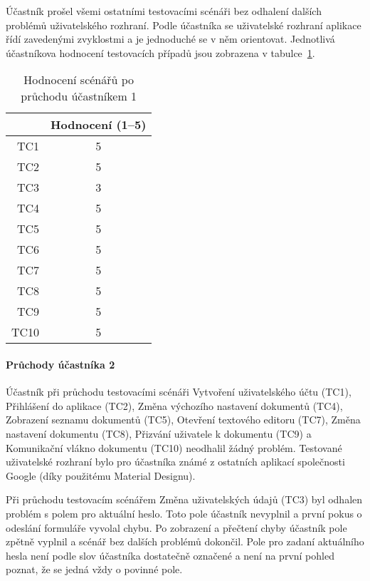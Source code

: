 Účastník prošel všemi ostatními testovacími scénáři bez odhalení dalších problémů uživatelského rozhraní.
Podle účastníka se uživatelské rozhraní aplikace řídí zavedenými zvyklostmi a je jednoduché se v něm orientovat.
Jednotlivá účastníkova hodnocení testovacích případů jsou zobrazena v tabulce~\ref{tab:poPrůchoduÚčastníkem1}.

\begin{table}[ht!]
    \centering
    \caption{Hodnocení scénářů po průchodu účastníkem 1}
    \label{tab:poPrůchoduÚčastníkem1}
    \begin{tabular}{r|c}
        & Hodnocení (1--5) \\ \hline
        TC1 & 5 \\
        TC2 & 5 \\
        TC3 & 3 \\
        TC4 & 5 \\
        TC5 & 5 \\
        TC6 & 5 \\
        TC7 & 5 \\
        TC8 & 5 \\
        TC9 & 5 \\
        TC10 & 5 \\
    \end{tabular}
\end{table}

\paragraph{Průchody účastníka 2}

Účastník při průchodu testovacími scénáři Vytvoření uživatelského účtu (TC1), Přihlášení do aplikace (TC2), Změna výchozího nastavení dokumentů (TC4), Zobrazení seznamu dokumentů (TC5),  Otevření textového editoru (TC7), Změna nastavení dokumentu (TC8), Přizvání uživatele k dokumentu (TC9) a Komunikační vlákno dokumentu (TC10) neodhalil žádný problém.
Testované uživatelské rozhraní bylo pro účastníka známé z ostatních aplikací společnosti Google (díky použitému Material Designu).

Při průchodu testovacím scénářem Změna uživatelských údajů (TC3) byl odhalen problém s polem pro aktuální heslo.
Toto pole účastník nevyplnil a první pokus o odeslání formuláře vyvolal chybu.
Po zobrazení a přečtení chyby účastník pole zpětně vyplnil a scénář bez dalších problémů dokončil.
Pole pro zadaní aktuálního hesla není podle slov účastníka dostatečně označené a není na první pohled poznat, že se jedná vždy o povinné pole.

